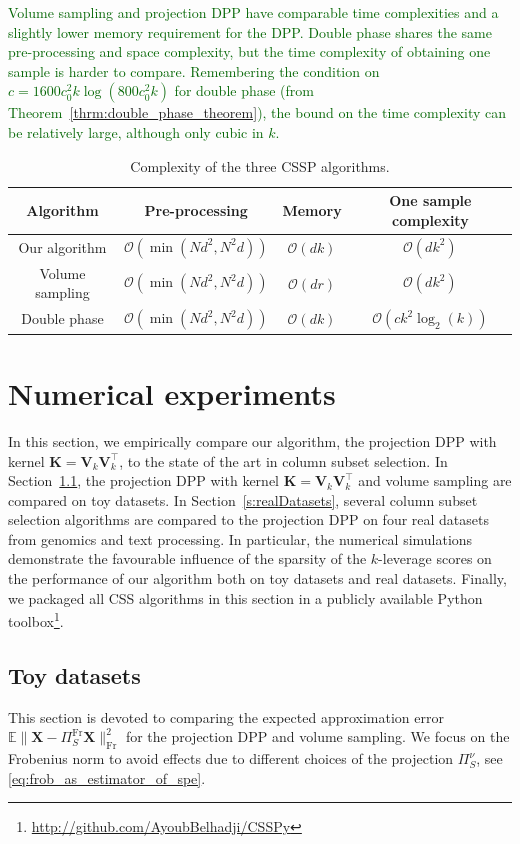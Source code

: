 \documentclass[twoside,11pt]{book}
\newcommand{\rev}[1]{\textcolor{darkgreen}{#1}}
\numberwithin{theorem}{chapter}
\numberwithin{definition}{chapter}
\numberwithin{proposition}{chapter}
\numberwithin{corollary}{chapter}
\numberwithin{example}{chapter}
\numberwithin{lemma}{chapter}
\DeclareMathOperator{\Fr}{\mathrm{Fr}}
\DeclareMathOperator{\Tran}{\intercal}
\begin{document}
\rev{Volume sampling and projection DPP have comparable time complexities and a slightly lower memory requirement for the DPP. Double phase shares the same pre-processing and space complexity, but the time complexity of obtaining one sample is harder to compare. Remembering the condition on $c = 1600 c_{0}^{2}k \log(800 c_{0}^{2} k)$ for double phase (from Theorem~\ref{thrm:double_phase_theorem}), the bound on the time complexity can be relatively large, although only cubic in $k$.}
\begin{table}
\centering
 \begin{tabular}{| c| c| c| c|}
 \hline
  Algorithm & Pre-processing & Memory & One sample complexity\\
 \hline
 Our algorithm & $\mathcal{O}(\min(N d^{2},N^{2}d))$ & $\mathcal{O}(dk)$ & $\mathcal{O}(dk^{2})$\\
 \hline
 Volume sampling & $\mathcal{O}(\min(N d^{2},N^{2}d))$ & $\mathcal{O}(dr)$ & $\mathcal{O}(dk^{2})$ \\
 \hline
 Double phase  & $\mathcal{O}(\min(N d^{2},N^{2}d))$ & $\mathcal{O}(dk)$ & $\mathcal{O}(c k^{2} \log_{2}(k))$\\
 \hline
\end{tabular}
\caption{Complexity of the three CSSP algorithms.\label{table:CSSP_complexity}}
\end{table}


\section{Numerical experiments}

In this section, we empirically compare our algorithm, the projection DPP with kernel $\bm{K}=\bm{V}_k\bm{V}_k^{\Tran}$, to the state of the art in column subset selection. In Section~\ref{s:toyDatasets}, the projection DPP with kernel $\bm{K}=\bm{V}_k\bm{V}_k^{\Tran}$ and volume sampling are compared on toy datasets. In Section~\ref{s:realDatasets}, several column subset selection algorithms are compared to the projection DPP on four real datasets from genomics and text processing. In particular, the numerical simulations demonstrate the favourable influence of the sparsity of the $k$-leverage scores on the performance of our algorithm both on toy datasets and real datasets. Finally, we packaged all CSS algorithms in this section in a publicly available Python toolbox\footnote{\url{http://github.com/AyoubBelhadji/CSSPy}}.

\subsection{Toy datasets}
\label{s:toyDatasets}
This section is devoted to comparing the expected approximation error $\mathbb{E} \|\bm{X}- \Pi_{S}^{\Fr} \bm{X}\|_{\Fr}^{2}$ for the projection DPP and volume sampling. We focus on the Frobenius norm to avoid effects due to different choices of the projection $\Pi_{S}^{\nu}$, see \eqref{eq:frob_as_estimator_of_spe}.
\end{document}
